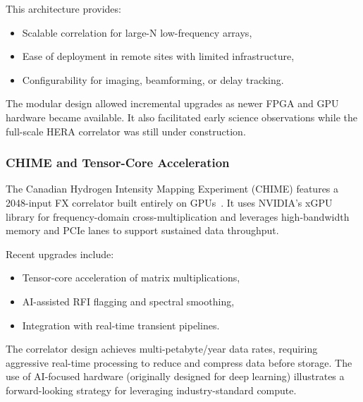         This architecture provides:
        
        \begin{itemize}
            \item Scalable correlation for large-N low-frequency arrays,
            
            \item Ease of deployment in remote sites with limited infrastructure,
            
            \item Configurability for imaging, beamforming, or delay tracking.
        \end{itemize}
        
        The modular design allowed incremental upgrades as newer FPGA and GPU hardware became available. It also facilitated early science observations while the full-scale HERA correlator was still under construction.

        \subsubsection{CHIME and Tensor-Core Acceleration}
        The Canadian Hydrogen Intensity Mapping Experiment (CHIME) features a 2048-input FX correlator built entirely on GPUs~\cite{Romein2021}. It uses NVIDIA's xGPU library for frequency-domain cross-multiplication and leverages high-bandwidth memory and PCIe lanes to support sustained data throughput.

        Recent upgrades include:
        
        \begin{itemize}
            \item Tensor-core acceleration of matrix multiplications,
            
            \item AI-assisted RFI flagging and spectral smoothing,
            
            \item Integration with real-time transient pipelines.
        \end{itemize}

        The correlator design achieves multi-petabyte/year data rates, requiring aggressive real-time processing to reduce and compress data before storage. The use of AI-focused hardware (originally designed for deep learning) illustrates a forward-looking strategy for leveraging industry-standard compute.

    \bigskip

